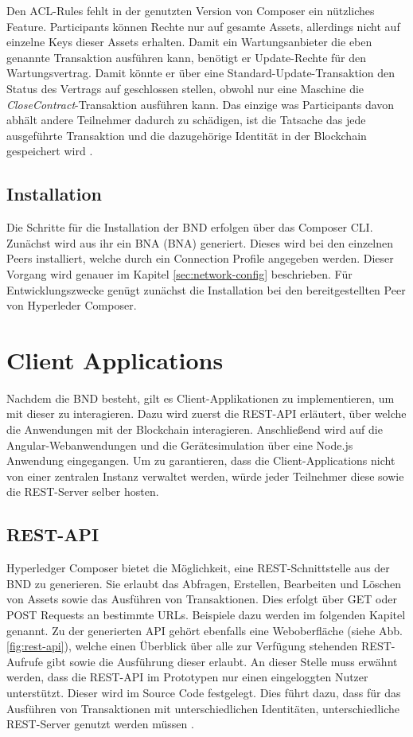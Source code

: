 Den ACL-Rules fehlt in der genutzten Version von Composer ein nützliches Feature. Participants können Rechte nur auf gesamte Assets, allerdings nicht auf einzelne Keys dieser Assets erhalten. Damit ein Wartungsanbieter die eben genannte Transaktion ausführen kann, benötigt er Update-Rechte für den Wartungsvertrag. Damit könnte er über eine Standard-Update-Transaktion den Status des Vertrags auf geschlossen stellen, obwohl nur eine Maschine die \textit{CloseContract}-Transaktion ausführen kann. Das einzige was Participants davon abhält andere Teilnehmer dadurch zu schädigen, ist die Tatsache das jede ausgeführte Transaktion und die dazugehörige Identität in der Blockchain gespeichert wird \cite{SchererPerformanceScalabilityBlockchain2017}.

\subsection{Installation}
Die Schritte für die Installation der \acs{BND} erfolgen über das Composer CLI. Zunächst wird aus ihr ein \acl{BNA} (\acs{BNA}) generiert. Dieses wird bei den einzelnen Peers installiert, welche durch ein Connection Profile angegeben werden. Dieser Vorgang wird genauer im Kapitel \ref{sec:network-config} beschrieben. Für Entwicklungszwecke genügt zunächst die Installation bei den bereitgestellten Peer von Hyperleder Composer.

\section{Client Applications}
Nachdem die \acs{BND} besteht, gilt es Client-Applikationen zu implementieren, um mit dieser zu interagieren. Dazu wird zuerst die REST-API erläutert, über welche die Anwendungen mit der Blockchain interagieren. Anschließend wird auf die Angular-Webanwendungen und die Gerätesimulation über eine Node.js Anwendung eingegangen. Um zu garantieren, dass die Client-Applications nicht von einer zentralen Instanz verwaltet werden, würde jeder Teilnehmer diese sowie die REST-Server selber hosten.

\subsection{REST-API}
\label{subsec:REST}
Hyperledger Composer bietet die Möglichkeit, eine REST-Schnittstelle aus der \acs{BND} zu generieren. Sie erlaubt das Abfragen, Erstellen, Bearbeiten und Löschen von Assets sowie das Ausführen von Transaktionen. Dies erfolgt über GET oder POST Requests an bestimmte URLs. Beispiele dazu werden im folgenden Kapitel genannt. Zu der generierten API gehört ebenfalls eine Weboberfläche (siehe Abb. \ref{fig:rest-api}), welche einen Überblick über alle zur Verfügung stehenden REST-Aufrufe gibt sowie die Ausführung dieser erlaubt. An dieser Stelle muss erwähnt werden, dass die REST-API im Prototypen nur einen eingeloggten Nutzer unterstützt. Dieser wird im Source Code festgelegt. Dies führt dazu, dass für das Ausführen von Transaktionen mit unterschiedlichen Identitäten, unterschiedliche REST-Server genutzt werden müssen \cite{HyperledgerComposerTeamRESTAPIHyperledger}.

